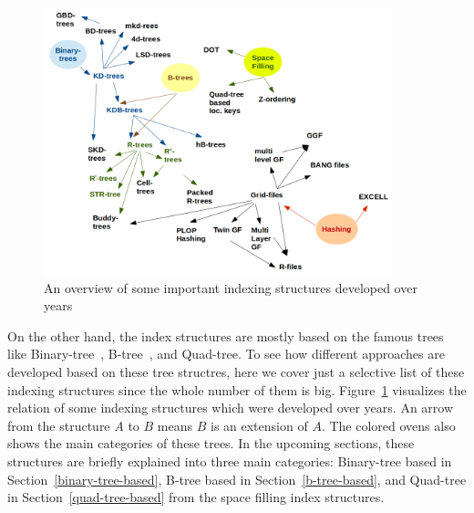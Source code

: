 \documentclass[a4paper,12pt]{article}
\begin{document}
\begin{figure}
\centering
\includegraphics[width=0.9\textwidth]{Trees}
\caption{An overview of some important indexing structures developed over years}
\label{trees}
\end{figure}

On the other hand, the index structures are mostly based on the famous trees like Binary-tree~\cite{binarytree}, B-tree~\cite{btree}, and Quad-tree. 
To see how different approaches are developed based on these tree structres, here we cover just a selective list of these indexing structures since the whole number of them
is big. Figure~\ref{trees} visualizes the relation of some indexing structures which were developed over years. An arrow from the structure $A$ to $B$ means $B$ is an extension of $A$. The colored ovens also shows the main categories of these
trees. In the upcoming sections, these structures are briefly explained into three main categories:
Binary-tree based in Section~\ref{binary-tree-based}, 
B-tree based in Section~\ref{b-tree-based}, 
and Quad-tree in Section~\ref{quad-tree-based} from the space filling index structures.
\end{document}
